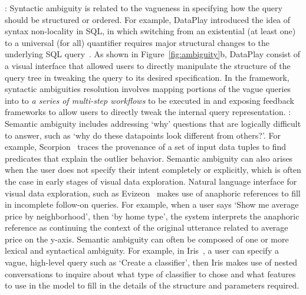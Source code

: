 : Syntactic ambiguity is related to the vagueness in specifying how the query should be structured or ordered. For example, DataPlay introduced the idea of syntax non-locality in SQL, in which switching from an existential (at least one) to a universal (for all) quantifier requires major structural changes to the underlying SQL query~\cite{Abouzied2012}. As shown in Figure~\ref{fig:ambiguity}b, DataPlay consist of a visual interface that allowed users to directly manipulate the structure of the query tree in tweaking the query to its desired specification. In the \vida framework, syntactic ambiguities resolution involves mapping portions of the vague queries into to \textit{a series of multi-step workflows} to be executed in \vidaql and exposing feedback frameworks to allow users to directly tweak the internal query representation. %
: Semantic ambiguity includes addressing `why' questions that are logically difficult to answer, such as `why do these datapoints look different from others?'. For example, Scorpion~\cite{Wu2013} traces the provenance of a set of input data tuples to find predicates that explain the outlier behavior. Semantic ambiguity can also arises when the user does not specify their intent completely or explicitly, which is often the case in early stages of visual data exploration. Natural language interface for visual data exploration, such as Evizeon~\cite{Hoque2017} makes use of anaphoric references to fill in incomplete follow-on queries. For example, when a user says `Show me average price by neighborhood', then `by home type', the system interprets the anaphoric reference as continuing the context of the original utterance related to average price on the y-axis. Semantic ambiguity can often be composed of one or more lexical and syntactical ambiguity. For example, in Iris~\cite{Fast2018}, a user can specify a vague, high-level query such as `Create a classifier', then Iris makes use of nested conversations to inquire about what type of classifier to chose and what features to use in the model to fill in the details of the structure and parameters required. 


